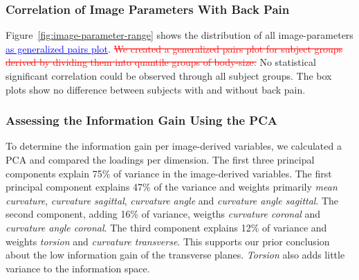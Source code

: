 \documentclass[a4paper,twoside]{style/article}
\newcommand{\rem}[1]{\textcolor{red}{\sout{#1}}}
\newcommand{\add}[1]{\textcolor{blue}{\uline{#1}}}
\begin{document}
\subsubsection{Correlation of Image Parameters With Back Pain}
Figure~\ref{fig:image-parameter-range} shows the distribution of all image-parameters \add{as generalized pairs plot}.
\rem{We created a generalized pairs plot for subject groups derived by dividing them into quantile groups of body-size.}
No statistical significant correlation could be observed through all subject groups.
The box plots show no difference between subjects with and without back pain.

\subsubsection{Assessing the Information Gain Using the PCA}
To determine the information gain per image-derived variables, we calculated a PCA and compared the loadings per dimension.
The first three principal components explain 75\% of variance in the image-derived variables.
The first principal component explains 47\% of the variance and weights primarily \emph{mean curvature}, \emph{curvature sagittal}, \emph{curvature angle} and \emph{curvature angle sagittal}.
The second component, adding 16\% of variance, weigths  \emph{curvature coronal} and \emph{curvature angle coronal}.
The third component explains 12\% of variance and weights \emph{torsion} and \emph{curvature transverse}.
This supports our prior conclusion about the low information gain of the transverse planes.
\emph{Torsion} also adds little variance to the information space.
\end{document}
